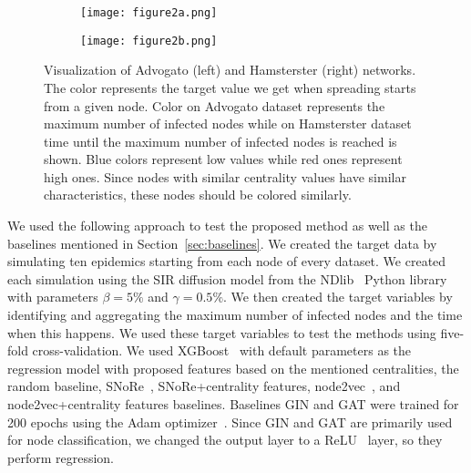 \documentclass{article}
\begin{document}
\begin{figure}[t!]
  \begin{subfigure}{0.49\textwidth}
    \centering
    \texttt{[image: figure2a.png]}
    \label{fig:networks1}
  \end{subfigure}
  \begin{subfigure}{0.49\textwidth}
    \centering
    \texttt{[image: figure2b.png]}
    \label{fig:networks2}
  \end{subfigure}
  \caption{Visualization of Advogato (left) and Hamsterster (right) networks. The color represents the target value we get when spreading starts from a given node. Color on Advogato dataset represents the maximum number of infected nodes while on Hamsterster dataset time until the maximum number of infected nodes is reached is shown. Blue colors represent low values while red ones represent high ones. Since nodes with similar centrality values have similar characteristics, these nodes should be colored similarly.}
  \label{fig:networks}
\end{figure}
We used the following approach to test the proposed method as well as the baselines mentioned in Section~\ref{sec:baselines}. We created the target data by simulating ten epidemics starting from each node of every dataset. We created each simulation using the SIR diffusion model from the NDlib~\cite{ndlib} Python library with parameters $\beta = 5\%$ and $\gamma = 0.5\%$. We then created the target variables by identifying and aggregating the maximum number of infected nodes and the time when this happens. We used these target variables to test the methods using five-fold cross-validation. We used XGBoost~\cite{xgboost} with default parameters as the regression model with proposed features based on the mentioned centralities, the random baseline, SNoRe~\cite{meznar2020snore}, SNoRe+centrality features, node2vec~\cite{grover2016node2vec}, and node2vec+centrality features baselines. Baselines GIN and GAT were trained for 200 epochs using the Adam optimizer~\cite{kingma2015Adam}. Since GIN and GAT are primarily used for node classification, we changed the output layer to a ReLU~\cite{nair2010relu} layer, so they perform regression.
\end{document}
